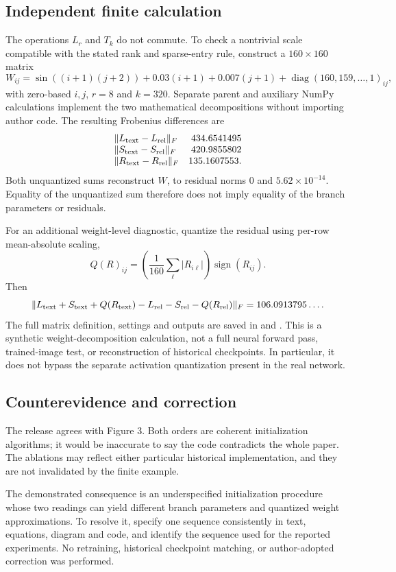 \documentclass[10pt]{article}
\begin{document}
\subsection*{Independent finite calculation}
The operations \(L_r\) and \(T_k\) do not commute. To check a nontrivial scale compatible with the stated rank and sparse-entry rule, construct a \(160\times160\) matrix \[W_{ij}=\sin((i+1)(j+2))+0.03(i+1)+0.007(j+1)
       +\operatorname{diag}(160,159,\ldots,1)_{ij},\] with zero-based \(i,j\), \(r=8\) and \(k=320\). Separate parent and auxiliary NumPy calculations implement the two mathematical decompositions without importing author code. The resulting Frobenius differences are \[\begin{array}{lr}
\|L_{\rm text}-L_{\rm rel}\|_F&434.6541495\\
\|S_{\rm text}-S_{\rm rel}\|_F&420.9855802\\
\|R_{\rm text}-R_{\rm rel}\|_F&135.1607553.
\end{array}\] Both unquantized sums reconstruct \(W\), to residual norms \(0\) and \(5.62\times10^{-14}\). Equality of the unquantized sum therefore does not imply equality of the branch parameters or residuals.\par
For an additional weight-level diagnostic, quantize the residual using per-row mean-absolute scaling, \[Q(R)_{ij}=\left(\frac1{160}\sum_{\ell}|R_{i\ell}|\right)
                    \operatorname{sign}(R_{ij}).\] Then \[\|L_{\rm text}+S_{\rm text}+Q(R_{\rm text})
 -L_{\rm rel}-S_{\rm rel}-Q(R_{\rm rel})\|_F
=106.0913795\ldots.\] The full matrix definition, settings and outputs are saved in and . This is a synthetic weight-decomposition calculation, not a full neural forward pass, trained-image test, or reconstruction of historical checkpoints. In particular, it does not bypass the separate activation quantization present in the real network.\par
\subsection*{Counterevidence and correction}
The release agrees with Figure 3. Both orders are coherent initialization algorithms; it would be inaccurate to say the code contradicts the whole paper. The ablations may reflect either particular historical implementation, and they are not invalidated by the finite example.\par
The demonstrated consequence is an underspecified initialization procedure whose two readings can yield different branch parameters and quantized weight approximations. To resolve it, specify one sequence consistently in text, equations, diagram and code, and identify the sequence used for the reported experiments. No retraining, historical checkpoint matching, or author-adopted correction was performed.\par
\end{document}
